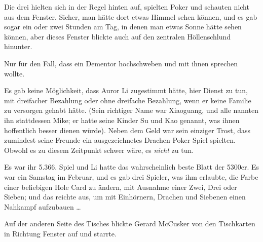 Die drei hielten sich in der Regel hinten auf, spielten Poker und schauten nicht aus dem Fenster. Sicher, man hätte dort etwas Himmel sehen können, und es gab sogar ein oder zwei Stunden am Tag, in denen man etwas Sonne hätte sehen können, aber dieses Fenster blickte auch auf den zentralen Höllenschlund hinunter.

Nur für den Fall, dass ein Dementor hochschweben und mit ihnen sprechen wollte.

Es gab keine Möglichkeit, dass Auror Li zugestimmt hätte, hier Dienst zu tun, mit dreifacher Bezahlung oder ohne dreifache Bezahlung, wenn er keine Familie zu versorgen gehabt hätte. (Sein richtiger Name war Xiaoguang, und alle nannten ihn stattdessen Mike; er hatte seine Kinder Su und Kao genannt, was ihnen hoffentlich besser dienen würde). Neben dem Geld war sein einziger Trost, dass zumindest seine Freunde ein ausgezeichnetes Drachen-Poker-Spiel spielten. Obwohl es zu diesem Zeitpunkt schwer wäre, es \emph{nicht} zu tun.

Es war ihr 5.366. Spiel und Li hatte das wahrscheinlich beste Blatt der 5300er. Es war ein Samstag im Februar, und es gab drei Spieler, was ihm erlaubte, die Farbe einer beliebigen Hole Card zu ändern, mit Ausnahme einer Zwei, Drei oder Sieben; und das reichte aus, um mit Einhörnern, Drachen und Siebenen einen Nahkampf aufzubauen …

Auf der anderen Seite des Tisches blickte Gerard McCusker von den Tischkarten in Richtung Fenster auf und starrte.

